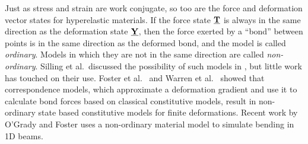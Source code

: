 \documentclass[preprint,review,12pt]{elsarticle}
\newcommand\vstate[3]{%
	\mathbf{\underline{#1}}%
	\ifstrempty{#2}{}{[#2]}%
	\ifstrempty{#3}{}{\langle #3 \rangle}}
\begin{document}
Just as stress and strain are work conjugate, so too are the force and deformation vector states for hyperelastic materials.  If the force state $\vstate{T}{}{}$ is always in the same direction as the deformation state $\vstate{Y}{}{}$, then the force exerted by a ``bond'' between points is in the same direction as the deformed bond, and the model is called \textit{ordinary}.  Models in which they are not in the same direction are called \textit{non-ordinary}.  Silling et al.\ discussed the possibility of such models in \cite{silling2010peridynamic}, but little work has touched on their use.  Foster et al.\ \cite{foster2010viscoplasticity} and Warren et al.\ \cite{warren2009non} showed that correspondence models, which approximate a deformation gradient and use it to calculate bond forces based on classical constitutive models, result in non-ordinary state based constitutive models for finite deformations. Recent work by O'Grady and Foster \cite{ogrady2014beams} uses a non-ordinary material model to simulate bending in 1D beams.
%
\end{document}
